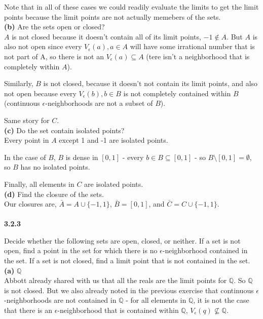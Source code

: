 Note that in all of these cases we could readily evaluate the limits to get the limit points because the limit points
are not actually memebers of the sets.
\\


\textbf{(b)} Are the sets open or closed?
\\

$A$ is not closed because it doesn't contain all of its limit points, $-1 \notin A$.
But $A$ is also not open since every $V_\epsilon (a), a\in A$ will have some irrational number that is not part of A,
so there is not an $V_{\epsilon} (a) \subseteq A$ (tere isn't a neighborhood that is completely within $A$).

Similarly, $B$ is not closed, because it doesn't not contain its limit points, and also not open
because every $V_\epsilon (b), b\in B$ is not completely contained within $B$
(continuous $\epsilon$-neighborhoods are not a subset of $B$).

Same story for $C$.
\\


\textbf{(c)} Do the set contain isolated points?
\\


Every point in $A$ except 1 and -1 are isolated points.

In the case of $B$, $B$ is dense in $[0,1]$ - every $b\in B \subseteq [0,1]$ - so $B \setminus [0,1] = \emptyset$, so
$B$ has no isolated points.

Finally, all elements in $C$ are isolated points.
\\

\textbf{(d)} Find the closure of the sets.
\\

Our closures are, $\bar{A} = A \cup \{-1, 1\}$, $\bar{B} = [0,1]$, and $\bar{C} = C \cup \{-1, 1\}$.
\\~\\


\label{abbott:3.2.3}
\textbf{3.2.3}

Decide whether the following sets are open, closed, or neither.
If a set is not open, find a point in the set for which there is no $\epsilon$-neighborhood contained in the set.
If a set is not closed, find a limit point that is not contained in the set. 
\\

\textbf{(a)} $\mathbb{Q}$
\\

Abbott already shared with us that all the reals are the limit points for $\mathbb{Q}$.
So $\mathbb{Q}$ is not closed.
But we also already noted in the previous exercise that continuous $\epsilon$-neighborhoods are not contained in
$\mathbb{Q}$ - for all elements in $\mathbb{Q}$, it is not the case that there is an $\epsilon$-neighborhood
that is contained within $\mathbb{Q}$, $V_\epsilon (q) \not\subseteq \mathbb{Q}$.

